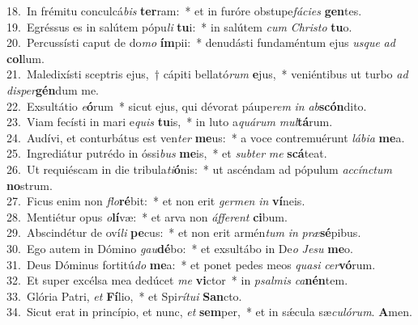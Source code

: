 {18.~}In frémitu conculcá\textit{bis} \textbf{ter}ram:~* et in furóre obstupe\textit{fá}\textit{ci}\textit{es} \textbf{gen}tes.\\
{19.~}Egréssus es in salútem pópu\textit{li} \textbf{tu}i:~* in salútem \textit{cum} \textit{Chri}\textit{sto} \textbf{tu}o.\\
{20.~}Percussísti caput de do\textit{mo} \textbf{ím}pii:~* denudásti fundaméntum ejus \textit{us}\textit{que} \textit{ad} \textbf{col}lum.\\
{21.~}Maledixísti sceptris ejus,~† cápiti bellató\textit{rum} \textbf{e}jus,~* veniéntibus ut turbo \textit{ad} \textit{di}\textit{sper}\textbf{gén}dum me.\\
{22.~}Exsultátio \textit{e}\textbf{ó}rum~* sicut ejus, qui dévorat páupe\textit{rem} \textit{in} \textit{ab}\textbf{scón}dito.\\
{23.~}Viam fecísti in mari e\textit{quis} \textbf{tu}is,~* in luto a\textit{quá}\textit{rum} \textit{mul}\textbf{tá}rum.\\
{24.~}Audívi, et conturbátus est ven\textit{ter} \textbf{me}us:~* a voce contremuérunt \textit{lá}\textit{bi}\textit{a} \textbf{me}a.\\
{25.~}Ingrediátur putrédo in óssi\textit{bus} \textbf{me}is,~* et \textit{sub}\textit{ter} \textit{me} \textbf{scá}teat.\\
{26.~}Ut requiéscam in die tribula\textit{ti}\textbf{ó}nis:~* ut ascéndam ad pópulum \textit{ac}\textit{cín}\textit{ctum} \textbf{no}strum.\\
{27.~}Ficus enim non \textit{flo}\textbf{ré}bit:~* et non erit \textit{ger}\textit{men} \textit{in} \textbf{ví}neis.\\
{28.~}Mentiétur opus \textit{o}\textbf{lí}væ:~* et arva non \textit{áf}\textit{fe}\textit{rent} \textbf{ci}bum.\\
{29.~}Abscindétur de oví\textit{li} \textbf{pe}cus:~* et non erit armén\textit{tum} \textit{in} \textit{præ}\textbf{sé}pibus.\\
{30.~}Ego autem in Dómino \textit{gau}\textbf{dé}bo:~* et exsultábo in De\textit{o} \textit{Je}\textit{su} \textbf{me}o.\\
{31.~}Deus Dóminus fortitú\textit{do} \textbf{me}a:~* et ponet pedes meos \textit{qua}\textit{si} \textit{cer}\textbf{vó}rum.\\
{32.~}Et super excélsa mea dedúcet \textit{me} \textbf{vi}ctor~* in \textit{psal}\textit{mis} \textit{ca}\textbf{nén}tem.\\
{33.~}Glória Patri, \textit{et} \textbf{Fí}lio,~* et Spi\textit{rí}\textit{tu}\textit{i} \textbf{San}cto.\\
{34.~}Sicut erat in princípio, et nunc, \textit{et} \textbf{sem}per,~* et in sǽcula sæ\textit{cu}\textit{ló}\textit{rum}. \textbf{A}men.\\

